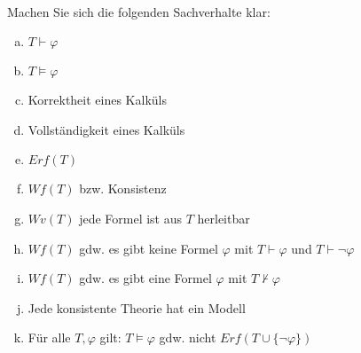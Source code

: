 \\
Machen Sie sich die folgenden Sachverhalte klar:
\begin{enumerate}[a)]
  \item $T\vdash \varphi$
  \item $T\models \varphi$
  \item Korrektheit eines Kalküls
  \item Vollständigkeit eines Kalküls
  \item $Erf(T)$
  \item $Wf(T)$ bzw. Konsistenz
  \item $Wv(T)$ jede Formel ist aus $T$ herleitbar
  \item $Wf(T)$ gdw. es gibt keine Formel $\varphi$ mit $T\vdash \varphi$ und $T\vdash \neg\varphi$
  \item $Wf(T)$ gdw. es gibt eine Formel $\varphi$ mit $T\nvdash \varphi$
  \item Jede konsistente Theorie hat ein Modell
  \item Für alle $T,\varphi$ gilt: $T\models \varphi$ gdw. nicht $Erf(T\cup\{\neg\varphi\})$
\end{enumerate}



